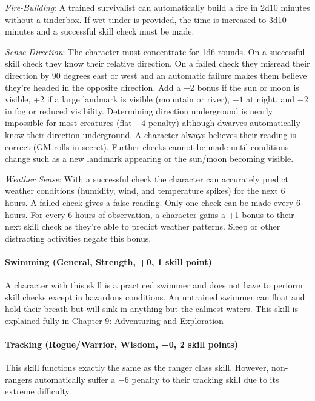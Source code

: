 \begin{multicols}{2}
\textit{Fire-Building}: A trained survivalist can automatically build a fire in 2d10 minutes without a tinderbox.  If wet tinder is provided, the time is increased to 3d10 minutes and a successful skill check must be made.  

\textit{Sense Direction}: The character must concentrate for 1d6 rounds.  On a successful skill check they know their relative direction.  On a failed check they misread their direction by 90 degrees east or west and an automatic failure makes them believe they're headed in the opposite direction.  Add a +2 bonus if the sun or moon is visible, +2 if a large landmark is visible (mountain or river), $-1$ at night, and $-2$ in fog or reduced visibility. Determining direction underground is nearly impossible for most creatures (flat $-4$ penalty) although dwarves automatically know their direction underground.  
A character always believes their reading is correct (GM rolls in secret).  Further checks cannot be made until conditions change such as a new landmark appearing or the sun/moon becoming visible. 

\textit{Weather Sense}: With a successful check the character can accurately predict weather conditions (humidity, wind, and temperature spikes) for the next 6 hours.  A failed check gives a false reading.  Only one check can be made every 6 hours.  For every 6 hours of observation, a character gains a +1 bonus to their next skill check as they're able to predict weather patterns.  Sleep or other distracting activities negate this bonus.

\paragraph{Swimming (General, Strength, +0, 1 skill point)}

A character with this skill is a practiced swimmer and does not have to perform skill checks except in hazardous conditions.  An untrained swimmer can float and hold their breath but will sink in anything but the calmest waters.  This skill is explained fully in Chapter 9: Adventuring and Exploration

\paragraph{Tracking (Rogue/Warrior, Wisdom, +0, 2 skill points)}

This skill functions exactly the same as the ranger class skill.  However, non-rangers automatically suffer a $-6$ penalty to their tracking skill due to its extreme difficulty.  


\end{multicols}
